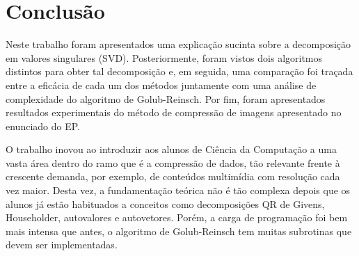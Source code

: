 \documentclass[brazil,times]{abnt}
\begin{document}
	
	
\chapter{Conclusão}
	Neste trabalho foram apresentados uma explicação sucinta sobre a decomposição em valores singulares (SVD). Posteriormente, foram vistos dois algoritmos distintos para obter tal decomposição e, em seguida, uma comparação foi traçada entre a eficácia de cada um dos métodos juntamente com uma análise de complexidade do algoritmo de Golub-Reinsch. Por fim, foram apresentados resultados experimentais do método de compressão de imagens apresentado no enunciado do EP.
	
	O trabalho inovou ao introduzir aos alunos de Ciência da Computação a uma vasta área dentro do ramo que é a compressão de dados, tão relevante frente à crescente demanda, por exemplo, de conteúdos multimídia com resolução cada vez maior. Desta vez, a fundamentação teórica não é tão complexa depois que os alunos já estão habituados a conceitos como decomposições QR de Givens, Householder, autovalores e autovetores. Porém, a carga de programação foi bem mais intensa que antes, o algoritmo de Golub-Reinsch tem muitas subrotinas que devem ser implementadas.
	
\nocite{*}


\end{document}
